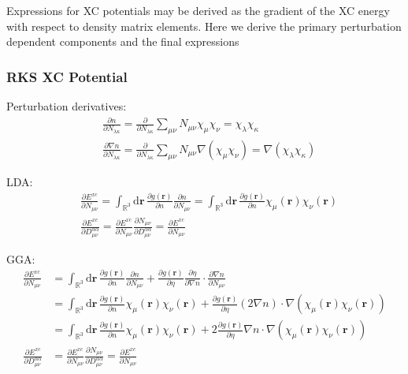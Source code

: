 \documentclass[11pt]{article}
\newcommand{\dd}[1]{\mathrm{d}{#1}\,}
\begin{document}
Expressions for XC potentials may be derived as the gradient of the XC energy with respect to density matrix elements. Here we derive the primary 
perturbation dependent components and the final expressions

\subsubsection{RKS XC Potential}

Perturbation derivatives:
\begin{align}
&\frac{\partial n}{\partial N_{\lambda\kappa}} = \frac{\partial}{\partial N_{\lambda\kappa}} \sum_{\mu\nu} N_{\mu\nu} \chi_\mu \chi_\nu
  = \chi_\lambda \chi_\kappa \\ 
&\frac{\partial \nabla n}{\partial N_{\lambda\kappa}} = \frac{\partial}{\partial N_{\lambda\kappa}} \sum_{\mu\nu} N_{\mu\nu} \nabla(\chi_\mu \chi_\nu)
  = \nabla(\chi_\lambda \chi_\kappa) 
\end{align}

LDA:
\begin{align}
&\frac{\partial E^{xc}}{\partial N_{\mu\nu}} = \int_{\mathbb{R}^3} \dd{\mathbf{r}} \frac{\partial g(\mathbf{r})}{\partial n} \frac{\partial n}{\partial N_{\mu\nu}}
 = \int_{\mathbb{R}^3} \dd{\mathbf{r}} \frac{\partial g(\mathbf{r})}{\partial n} \chi_\mu(\mathbf{r}) \chi_\nu(\mathbf{r}) \\
&\frac{\partial E^{xc}}{\partial D^{\alpha\alpha}_{\mu\nu}} 
  = \frac{\partial E^{xc}}{\partial N_{\mu\nu}} \frac{\partial N_{\mu\nu}}{\partial D^{\alpha\alpha}_{\mu\nu}}
  = \frac{\partial E^{xc}}{\partial N_{\mu\nu}} 
\end{align}

GGA:
\begin{align}
\frac{\partial E^{xc}}{\partial N_{\mu\nu}} &= \int_{\mathbb{R}^3} \dd{\mathbf{r}} 
  \frac{\partial g(\mathbf{r})}{\partial n}   \frac{\partial n}   {\partial N_{\mu\nu}} +
  \frac{\partial g(\mathbf{r})}{\partial \eta}\frac{\partial \eta}{\partial \nabla n} \cdot\frac{\partial \nabla n}{\partial N_{\mu\nu}} \nonumber \\ 
&= \int_{\mathbb{R}^3} \dd{\mathbf{r}} \frac{\partial g(\mathbf{r})}{\partial n} \chi_\mu(\mathbf{r}) \chi_\nu(\mathbf{r}) +
   \frac{\partial g(\mathbf{r})}{\partial \eta} (2\nabla n) \cdot \nabla( \chi_\mu(\mathbf{r}) \chi_\nu(\mathbf{r}) ) \nonumber \\
&= \int_{\mathbb{R}^3} \dd{\mathbf{r}} \frac{\partial g(\mathbf{r})}{\partial n} \chi_\mu(\mathbf{r}) \chi_\nu(\mathbf{r}) +
   2\frac{\partial g(\mathbf{r})}{\partial \eta} \nabla n \cdot \nabla( \chi_\mu(\mathbf{r}) \chi_\nu(\mathbf{r}) )\\ 
\frac{\partial E^{xc}}{\partial D^{\alpha\alpha}_{\mu\nu}} 
  &= \frac{\partial E^{xc}}{\partial N_{\mu\nu}} \frac{\partial N_{\mu\nu}}{\partial D^{\alpha\alpha}_{\mu\nu}}
  = \frac{\partial E^{xc}}{\partial N_{\mu\nu}} 
\end{align}
\end{document}
